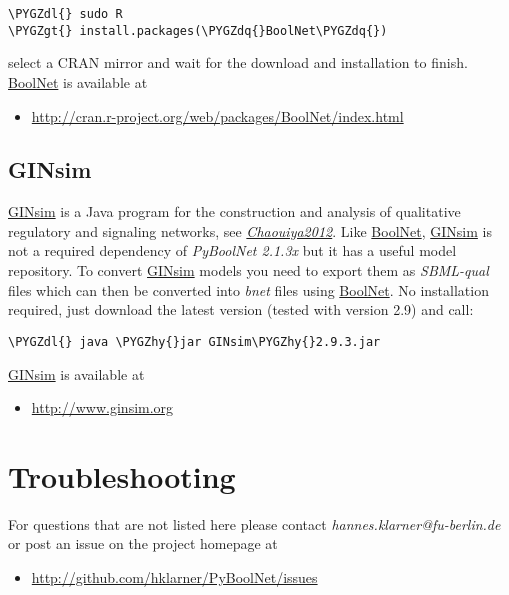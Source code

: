 \documentclass[letterpaper,10pt,english]{sphinxmanual}
\def\PYGZgt{\char`\>}
\def\PYGZdl{\char`\$}
\def\PYGZhy{\char`\-}
\def\PYGZdq{\char`\"}
\begin{document}
\begin{Verbatim}[commandchars=\\\{\}]
\PYGZdl{} sudo R
\PYGZgt{} install.packages(\PYGZdq{}BoolNet\PYGZdq{})
\end{Verbatim}

select a CRAN mirror and wait for the download and installation to finish.
\href{https://cran.r-project.org/web/packages/BoolNet/index.html}{BoolNet} is available at
\begin{itemize}
\item {} 
\href{http://cran.r-project.org/web/packages/BoolNet/index.html}{http://cran.r-project.org/web/packages/BoolNet/index.html}

\end{itemize}


\subsection{GINsim}
\label{Installation:installation-ginsim}\label{Installation:ginsim}
\href{http://ginsim.org/home}{GINsim} is a Java program for the construction and analysis of qualitative regulatory and signaling networks, see {\hyperref[Bibliography:chaouiya2012]{\emph{Chaouiya2012}}}.
Like \href{https://cran.r-project.org/web/packages/BoolNet/index.html}{BoolNet}, \href{http://ginsim.org/home}{GINsim} is not a required dependency of \emph{PyBoolNet 2.1.3x} but it has a useful model repository. To convert \href{http://ginsim.org/home}{GINsim} models you need to export them as \emph{SBML-qual} files which can then be converted into \emph{bnet} files using \href{https://cran.r-project.org/web/packages/BoolNet/index.html}{BoolNet}.
No installation required, just download the latest version (tested with version 2.9) and call:

\begin{Verbatim}[commandchars=\\\{\}]
\PYGZdl{} java \PYGZhy{}jar GINsim\PYGZhy{}2.9.3.jar
\end{Verbatim}

\href{http://ginsim.org/home}{GINsim} is available at
\begin{itemize}
\item {} 
\href{http://www.ginsim.org}{http://www.ginsim.org}

\end{itemize}


\section{Troubleshooting}
\label{Installation:installation-troubleshooting}\label{Installation:troubleshooting}
For questions that are not listed here please contact \emph{hannes.klarner@fu-berlin.de} or post an issue on the project homepage at
\begin{itemize}
\item {} 
\href{http://github.com/hklarner/PyBoolNet/issues}{http://github.com/hklarner/PyBoolNet/issues}

\end{itemize}
\end{document}
